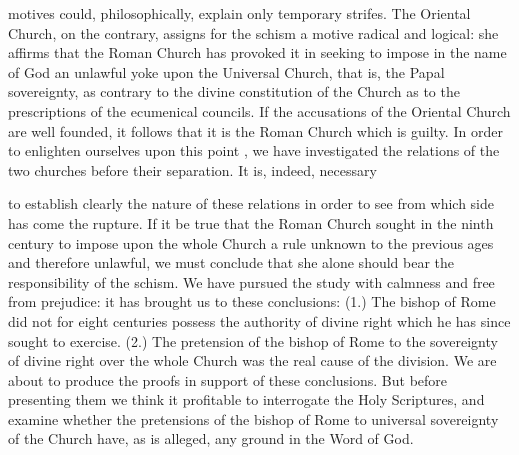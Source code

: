 motives could, philosophically, explain only temporary strifes. The Oriental Church, on the contrary, assigns for the schism a motive radical and logical: she affirms that the Roman Church has provoked it in seeking to impose in the name of God an unlawful yoke upon the Universal Church, that is, the Papal sovereignty, as contrary to the divine constitution of the Church as to the prescriptions of the ecumenical councils. If the accusations of the Oriental Church are well founded, it follows that it is the Roman Church which is guilty. In order to enlighten ourselves upon this point , we have investigated the relations of the two churches before their separation. It is, indeed, necessary

to establish clearly the nature of these relations in order to see from which side has come the rupture. If it be true that the Roman Church sought in the ninth century to impose upon the whole Church a rule unknown to the previous ages and therefore unlawful, we must conclude that she alone should bear the responsibility of the schism. We have pursued the study with calmness and free from prejudice: it has brought us to these conclusions: (1.) The bishop of Rome did not for eight centuries possess the authority of divine right which he has since sought to exercise. (2.) The pretension of the bishop of Rome to the sovereignty of divine right over the whole Church was the real cause of the division. We are about to produce the proofs in support of these conclusions. But before presenting them we think it profitable to interrogate the Holy Scriptures, and examine whether the pretensions of the bishop of Rome to universal sovereignty of the Church have, as is alleged, any ground in the Word of God.



